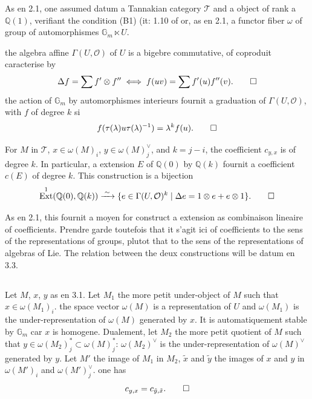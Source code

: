\documentclass[12pt,a4paper]{article}
\theoremstyle{plain}
\theoremstyle{definition}
\theoremstyle{remark}
\DeclareMathOperator{\Ext}{Ext}
\newcommand{\Q}{\mathbb{Q}}
\newcommand{\Gm}{\mathbb{G}_m}
\begin{document}
{{As en 2.1, one assumed datum a Tannakian category $\mathcal{T}$ and a object of rank a $\Q(1)$, verifiant the condition (B1) (it: 1.10 of or, as en 2.1, a functor fiber $\omega$ of group of automorphismes $\Gm\ltimes U$.

the algebra affine $\Gamma(U,\mathcal{O})$ of $U$ is a bigebre commutative, of coproduit caracterise by
\begin{equation*}
\Delta f = \sum f'\otimes f'' \iff f(uv) = \sum f'(u)f''(v).\qedhere
\end{equation*}
the action of $\Gm$ by automorphismes interieurs fournit a graduation of $\Gamma(U,\mathcal{O})$, with $f$ of degree $k$ si
\begin{equation*}
f(\tau(\lambda)u\tau(\lambda)^{-1}) = \lambda^k f(u).\qedhere
\end{equation*}

For $M$ in $\mathcal{T}$, $x\in\omega(M)_i$, $y\in\omega(M)_j^\vee$, and $k=j-i$, the coefficient $c_{y,x}$ is of degree $k$. In particular, a extension $E$ of $\Q(0)$ by $\Q(k)$ fournit a coefficient $c(E)$ of degree $k$. This construction is a bijection
\begin{equation*}
\Ext^1(\Q(0),\Q(k)) \xrightarrow{\;\sim\;} \{e\in\Gamma(U,\mathcal{O})^k \mid \Delta e = 1\otimes e + e\otimes 1\}.\qedhere
\end{equation*}

As en 2.1, this fournit a moyen for construct a extension as combinaison lineaire of coefficients. Prendre garde toutefois that it s'agit ici of coefficients to the sens of the representations of groups, plutot that to the sens of the representations of algebras of Lie. The relation between the deux constructions will be datum en 3.3.

\subsection{}

Let $M$, $x$, $y$ as en 3.1. Let $M_1$ the more petit under-object of $M$ such that $x\in\omega(M_1)_i$. the space vector $\omega(M)$ is a representation of $U$ and $\omega(M_1)$ is the under-representation of $\omega(M)$ generated by $x$. It is automatiquement stable by $\Gm$ car $x$ is homogene. Dualement, let $M_2$ the more petit quotient of $M$ such that $y\in\omega(M_2)_j^*\subset\omega(M)_j^*$: $\omega(M_2)^\vee$ is the under-representation of $\omega(M)^\vee$ generated by $y$. Let $M'$ the image of $M_1$ in $M_2$, $\tilde{x}$ and $\tilde{y}$ the images of $x$ and $y$ in $\omega(M')_i$ and $\omega(M')_j^\vee$. one has
\begin{equation*}
c_{y,x} = c_{\tilde{y},\tilde{x}}.\qedhere
\end{equation*}

}}
\end{document}
